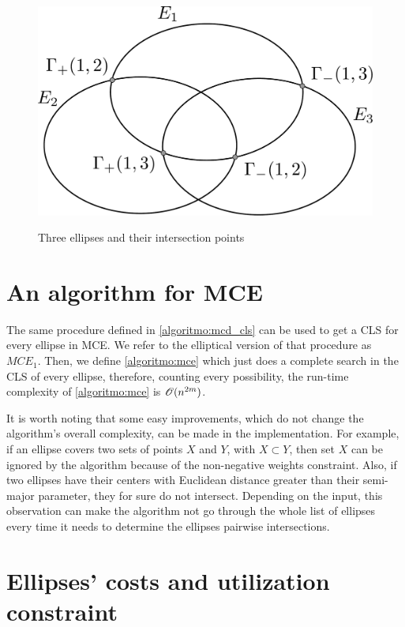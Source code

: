 \begin{figure}[H]
\centering
    \caption{Three ellipses and their intersection points}
    \includegraphics[scale=.32]{tex/figures/3ellipses_intersect.pdf}
    \fautor
    \label{fig:3ellipses_intersect}
\end{figure}
\section{An algorithm for MCE}

The same procedure defined in \autoref{algoritmo:mcd_cls} can be used to get a CLS for every ellipse in MCE. We refer to the elliptical version of that procedure as $MCE_1$. Then, we define \autoref{algoritmo:mce} which just does a complete search in the CLS of every ellipse, therefore, counting every possibility, the run-time complexity of \autoref{algoritmo:mce} is $\mathscr{O}(n^{2m})$.

It is worth noting that some easy improvements, which do not change the algorithm's overall complexity, can be made in the implementation. For example, if an ellipse covers two sets of points $X$ and $Y$, with $X \subset Y$, then set $X$ can be ignored by the algorithm because of the non-negative weights constraint. Also, if two ellipses have their centers with Euclidean distance greater than their semi-major parameter, they for sure do not intersect. Depending on the input, this observation can make the algorithm not go through the whole list of ellipses every time it needs to determine the ellipses pairwise intersections.

\section{Ellipses' costs and utilization constraint}

